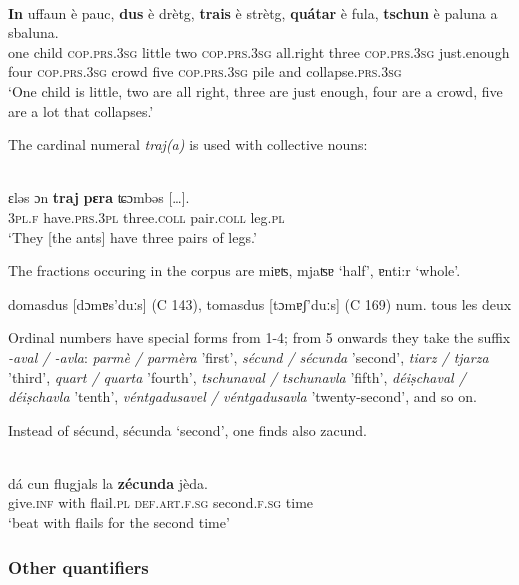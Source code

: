 {\ea\label{}
\\
\gll  \textbf{In} uffaun è pauc, \textbf{dus} è drètg, \textbf{trais} è strètg, \textbf{quátar} è fula, \textbf{tschun} è paluna a sbaluna.\\
    one child \textsc{cop.prs.3sg} little two \textsc{cop.prs.3sg} all.right three  \textsc{cop.prs.3sg} just.enough four  \textsc{cop.prs.3sg} crowd five  \textsc{cop.prs.3sg} pile and  collapse.\textsc{prs.3sg}\\
\glt `One child is little, two are all right, three are just enough, four are a crowd, five are a lot that collapses.'
\z


The cardinal numeral \textit{traj(a)} is used with collective nouns:%

\ea\label{}
\\
\gll    ɛləs ɔn \textbf{traj} \textbf{pɛra} ʨɔmbəs […].\\
    \textsc{3pl.f} have.\textsc{prs.3pl} three.\textsc{coll} pair.\textsc{coll} leg.\textsc{pl}\\
\glt `They [the ants] have three pairs of legs.'
\z

The fractions occuring in the corpus are miɐʦ, mjaʦɐ ‘half’, ɐnti:r ‘whole’.

domasdus [dɔmɐs'duːs] (C 143), tomasdus [tɔmɐʃ'duːs] (C 169) num. tous les deux

Ordinal numbers have special forms from 1-4; from 5 onwards they take the suffix \textit{-aval / -avla}: \textit{parmè / parmèra} 'first', \textit{sécund / sécunda} 'second', \textit{tiarz / tjarza} 'third', \textit{quart / quarta} 'fourth', \textit{tschunaval / tschunavla} 'fifth', \textit{déiṣchaval / déiṣchavla} 'tenth', \textit{ véntgadusavel / véntgadusavla} 'twenty-second', and so on.

Instead of sécund, sécunda `second', one finds also zacund.

\ea\label{}
\\
\gll  dá cun flugjals la \textbf{zécunda} jèda.\\
    give.\textsc{inf} with flail.\textsc{pl} \textsc{def.art.f.sg} second.\textsc{f.sg} time \\
\glt `beat with flails for the second time'
\z


\subsubsection{Other quantifiers}

}
